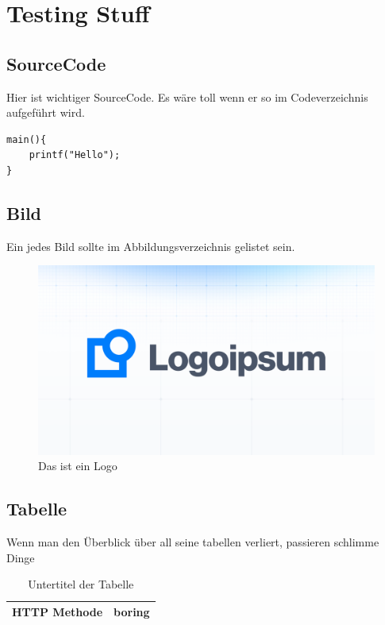 \chapter{Testing Stuff}
\section{SourceCode}
Hier ist wichtiger SourceCode. Es wäre toll wenn er so im Codeverzeichnis aufgeführt wird.
\begin{lstlisting}[caption=Test um SourceCode zu zeigen, label=codeExample]
main(){
    printf("Hello");
}
\end{lstlisting}

\section{Bild}
Ein jedes Bild sollte im Abbildungsverzeichnis gelistet sein.
\begin{figure}[ht]
    \centering
    \includegraphics[width=\textwidth]{images/logoipsum.png}
    \caption{Das ist ein Logo}
    \label{fig:ExampleImage}
\end{figure}


\section{Tabelle}
Wenn man den Überblick über all seine tabellen verliert, passieren schlimme Dinge
\begin{table}[H]
    \centering
    \begin{tabular}{|c|c|}
        \hline
        HTTP Methode & boring \\
        \hline
    \end{tabular}
    \caption{Untertitel der Tabelle}
    \label{tab:Requests}
\end{table}

